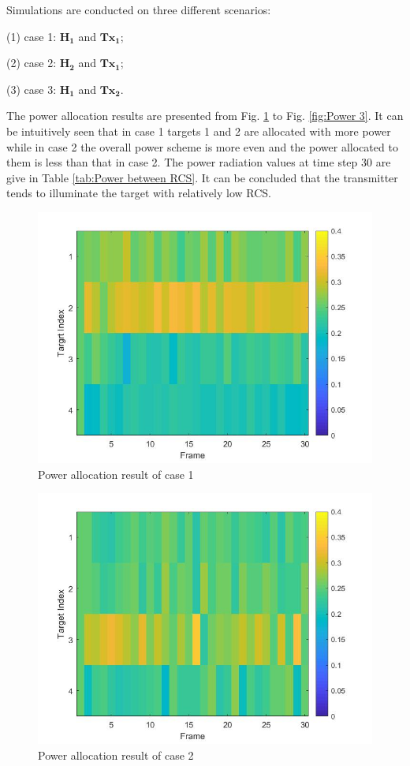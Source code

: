 \documentclass[12pt,journal,draftclsnofoot,onecolumn]{IEEEtran}
\begin{document}
Simulations are conducted on three different scenarios:

(1) case 1: $\mathbf{H_1}$ and $\mathbf{Tx_1}$;

(2) case 2: $\mathbf{H_2}$ and $\mathbf{Tx_1}$;

(3) case 3: $\mathbf{H_1}$ and $\mathbf{Tx_2}$.

The power allocation results are presented from Fig. \ref{fig:Power 1} to Fig. \ref{fig:Power 3}. It can be intuitively seen that in case 1 targets 1 and 2 are allocated with more power while in case 2 the overall power scheme is more even and the power allocated to them is less than that in case 2. The power radiation values at time step 30 are give in Table \ref{tab:Power between RCS}. It can be concluded that the transmitter tends to illuminate the target with relatively low RCS.

\begin{figure}
	\centering
	\includegraphics[scale=0.36]{Power1.jpg}
	\caption{Power allocation result of case 1}
	\label{fig:Power 1}
\end{figure}

\begin{figure}
	\centering
	\includegraphics[scale=0.36]{Power2.jpg}
	\caption{Power allocation result of case 2}
	\label{fig:Power 2}
\end{figure}
\end{document}
